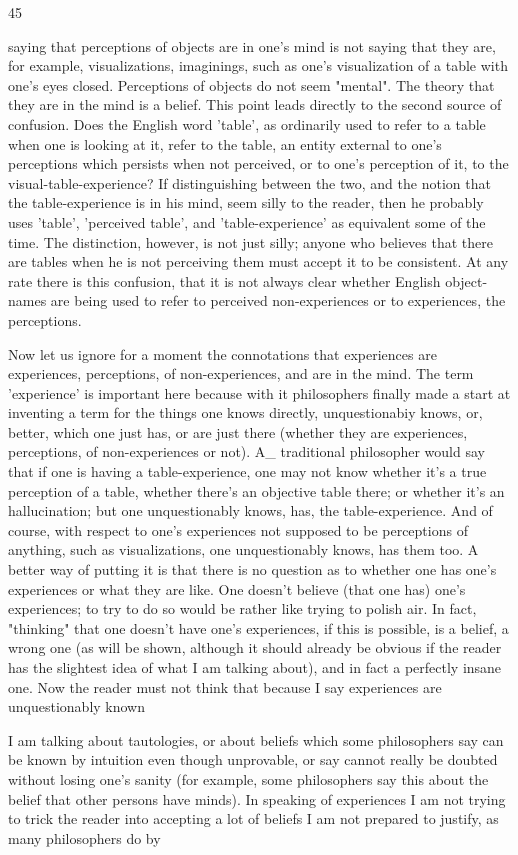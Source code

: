 \documentclass[10pt,twoside]{memoir}
\begin{document}
\begin{enumerate}
{{{{{{{{{{45 


saying that perceptions of objects are in one's mind is not saying that they 
are, for example, visualizations, imaginings, such as one's visualization of a 
table with one's eyes closed. Perceptions of objects do not seem "mental". 
The theory that they are in the mind is a belief. This point leads directly to 
the second source of confusion. Does the English word 'table', as ordinarily 
used to refer to a table when one is looking at it, refer to the table, an entity 
external to one's perceptions which persists when not perceived, or to one's 
perception of it, to the visual-table-experience? If distinguishing between 
the two, and the notion that the table-experience is in his mind, seem silly to 
the reader, then he probably uses 'table', 'perceived table', and 
'table-experience' as equivalent some of the time. The distinction, however, 
is not just silly; anyone who believes that there are tables when he is not 
perceiving them must accept it to be consistent. At any rate there is this 
confusion, that it is not always clear whether English object-names are being 
used to refer to perceived non-experiences or to experiences, the 
perceptions. 

Now let us ignore for a moment the connotations that experiences are 
experiences, perceptions, of non-experiences, and are in the mind. The term 
'experience' is important here because with it philosophers finally made a 
start at inventing a term for the things one knows directly, unquestionabiy 
knows, or, better, which one just has, or are just there (whether they are 
experiences, perceptions, of non-experiences or not). A_ traditional 
philosopher would say that if one is having a table-experience, one may not 
know whether it's a true perception of a table, whether there's an objective 
table there; or whether it's an hallucination; but one unquestionably knows, 
has, the table-experience. And of course, with respect to one's experiences 
not supposed to be perceptions of anything, such as visualizations, one 
unquestionably knows, has them too. A better way of putting it is that there 
is no question as to whether one has one's experiences or what they are like. 
One doesn't believe (that one has) one's experiences; to try to do so would 
be rather like trying to polish air. In fact, "thinking" that one doesn't have 
one's experiences, if this is possible, is a belief, a wrong one (as will be 
shown, although it should already be obvious if the reader has the slightest 
idea of what I am talking about), and in fact a perfectly insane one. Now the 
reader must not think that because I say experiences are unquestionably 
known {I am talking about tautologies, or about beliefs which some 
philosophers say can be known by intuition even though unprovable, or say 
cannot really be doubted without losing one's sanity (for example, some 
philosophers say this about the belief that other persons have minds). In 
speaking of experiences I am not trying to trick the reader into accepting a 
lot of beliefs I am not prepared to justify, as many philosophers do by 


}}}}}}}}}}}
\end{enumerate}
\end{document}
